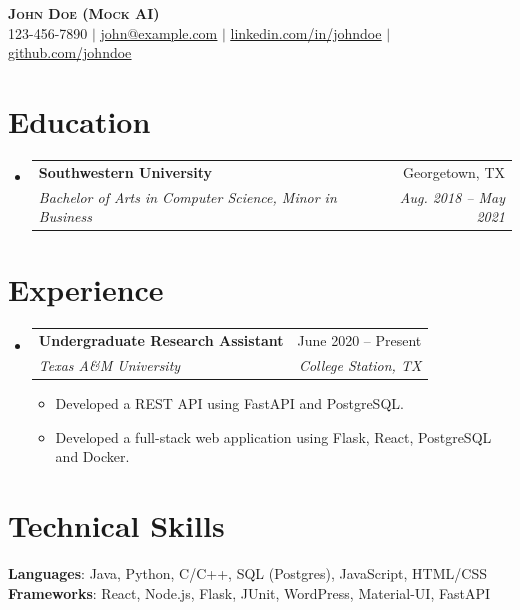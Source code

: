 \documentclass[letterpaper,11pt]{article}
\makeatletter
\newcommand{\resumeItem}[1]{
  \item\small{
    {#1 \vspace{-2pt}}
  }
}
\newcommand{\resumeSubheading}[4]{
  \vspace{-2pt}\item
    \begin{tabular*}{0.97\textwidth}[t]{l@{\extracolsep{\fill}}r}
      \textbf{#1} & #2 \\
      \textit{\small#3} & \textit{\small #4} \\
    \end{tabular*}\vspace{-7pt}
}
\newcommand{\resumeSubHeadingListStart}{\begin{itemize}[leftmargin=0.15in, label={}]}
\newcommand{\resumeSubHeadingListEnd}{\end{itemize}}
\newcommand{\resumeItemListStart}{\begin{itemize}}
\newcommand{\resumeItemListEnd}{\end{itemize}\vspace{-5pt}}
\makeatother
\begin{document}
\begin{center}
    \textbf{\Huge \scshape John Doe (Mock AI)} \\ \vspace{1pt}
    \small 123-456-7890 $|$ \href{mailto:x@x.com}{\underline{john@example.com}} $|$ 
    \href{https://linkedin.com/in/...}{\underline{linkedin.com/in/johndoe}} $|$
    \href{https://github.com/...}{\underline{github.com/johndoe}}
\end{center}

\section{Education}
  \resumeSubHeadingListStart
    \resumeSubheading
      {Southwestern University}{Georgetown, TX}
      {Bachelor of Arts in Computer Science, Minor in Business}{Aug. 2018 -- May 2021}
  \resumeSubHeadingListEnd

\section{Experience}
  \resumeSubHeadingListStart
    \resumeSubheading
      {Undergraduate Research Assistant}{June 2020 -- Present}
      {Texas A\&M University}{College Station, TX}
      \resumeItemListStart
        \resumeItem{Developed a REST API using FastAPI and PostgreSQL.}
        \resumeItem{Developed a full-stack web application using Flask, React, PostgreSQL and Docker.}
      \resumeItemListEnd
  \resumeSubHeadingListEnd

\section{Technical Skills}
 \begin{itemize}[leftmargin=0.15in, label={}]
    \small{\item{
     \textbf{Languages}{: Java, Python, C/C++, SQL (Postgres), JavaScript, HTML/CSS} \\
     \textbf{Frameworks}{: React, Node.js, Flask, JUnit, WordPress, Material-UI, FastAPI} \\
    }}
 \end{itemize}
\end{document}
